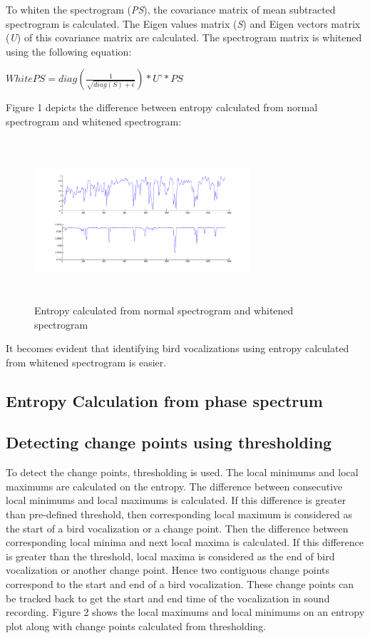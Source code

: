 \documentclass[a4paper]{article}
\begin{document}
To whiten the spectrogram (\textit{PS}), the covariance matrix of mean subtracted spectrogram is calculated. The Eigen values matrix (\textit{S}) and Eigen vectors matrix (\textit{U}) of this covariance matrix are calculated. The spectrogram matrix is whitened using the following equation:

\hspace{1cm}

$WhitePS=diag(\frac{1}{\sqrt{diag(S)+\epsilon}})*\textit{U'}*\textit{PS}$


\hspace{1cm}


Figure 1 depicts the difference between entropy calculated from normal spectrogram and whitened spectrogram:
\begin{figure}[!ht]
	\centering
	\includegraphics[width=8cm, height=6cm]{entropy}
	\caption{ Entropy calculated from normal spectrogram and whitened spectrogram}   
\end{figure}

It becomes evident that identifying bird vocalizations using entropy calculated from whitened spectrogram is easier.  



\subsection{Entropy Calculation from phase spectrum}



\subsection{Detecting change points using thresholding}

To detect the change points, thresholding is used. The local minimums and local maximums are calculated on the  entropy. The difference between consecutive local minimums and local maximums is calculated. If this difference is greater than pre-defined threshold, then corresponding local maximum is considered as the start of a bird vocalization or a change point. Then the difference between corresponding local minima and next local maxima is calculated. If this difference is greater than the threshold, local maxima is considered as the end of bird vocalization or another change point. Hence two contiguous change points correspond to the start and end of a bird vocalization. These change points can be tracked back to get the start and end time of the vocalization in sound recording. Figure 2 shows the local maximums and local minimums on an entropy plot along with change points calculated from thresholding.
\end{document}
